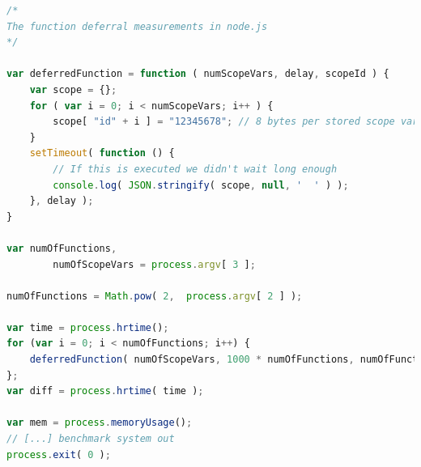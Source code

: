 \begin{lstlisting}[frame=single,float=h,label=lst_bm_js,language=JavaScript,caption=Closure Benchmarking: JavaScript Code]
/*
The function deferral measurements in node.js
*/

var deferredFunction = function ( numScopeVars, delay, scopeId ) {
	var scope = {};
	for ( var i = 0; i < numScopeVars; i++ ) {
		scope[ "id" + i ] = "12345678"; // 8 bytes per stored scope variable
	}
	setTimeout( function () {
		// If this is executed we didn't wait long enough
		console.log( JSON.stringify( scope, null, '  ' ) );
	}, delay );
}

var numOfFunctions,
		numOfScopeVars = process.argv[ 3 ];

numOfFunctions = Math.pow( 2,  process.argv[ 2 ] );

var time = process.hrtime();
for (var i = 0; i < numOfFunctions; i++) {
	deferredFunction( numOfScopeVars, 1000 * numOfFunctions, numOfFunctions + "(" + i + ")" );
};
var diff = process.hrtime( time );

var mem = process.memoryUsage();
// [...] benchmark system out
process.exit( 0 );

\end{lstlisting}


